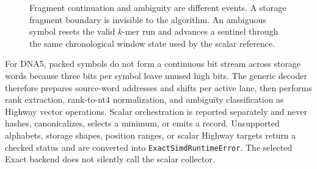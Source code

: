 \begin{figure}[ht]
\centering
{}
\caption{Fragment continuation and ambiguity are different events.  A storage
fragment boundary is invisible to the algorithm.  An ambiguous symbol resets
the valid $k$-mer run and advances a sentinel through the same chronological
window state used by the scalar reference.}
\label{fig:exact-continuation}
\end{figure}

For DNA5, packed symbols do not form a continuous bit stream across storage
words because three bits per symbol leave unused high bits.  The generic
decoder therefore prepares source-word addresses and shifts per active lane,
then performs rank extraction, rank-to-nt4 normalization, and ambiguity
classification as Highway vector operations.  Scalar orchestration is
reported separately and never hashes, canonicalizes, selects a minimum, or
emits a record.  Unsupported alphabets, storage shapes, position ranges, or
scalar Highway targets return a checked status and are converted into
\texttt{ExactSimdRuntimeError}. The selected Exact backend does not silently
call the scalar collector.

